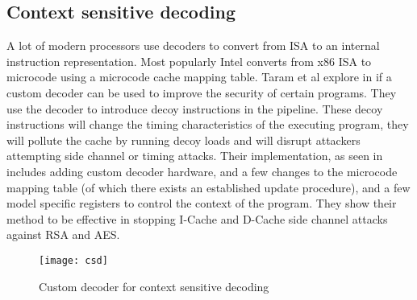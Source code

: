 \subsection{Context sensitive decoding}

A lot of modern processors use decoders to convert from ISA to an internal
instruction representation. Most popularly Intel converts from x86 ISA to
microcode using a microcode cache mapping table. Taram et al explore in
 if a custom decoder can be used to improve the security of
certain programs. They use the decoder to introduce decoy instructions in the
pipeline. These decoy instructions will change the timing characteristics of
the executing program, they will pollute the cache by running decoy loads and
will disrupt attackers attempting side channel or timing attacks. Their
implementation, as seen in  includes adding custom decoder
hardware, and a few changes to the microcode mapping table (of which there
exists an established update procedure), and a few model specific registers to
control the context of the program. They show their method to be effective in
stopping I-Cache and D-Cache side channel attacks against RSA and AES.

\begin{figure}[hb]
    \centering
    \texttt{[image: csd]}
    \caption{Custom decoder for context sensitive decoding}
    \label{fig:csd}
\end{figure}

